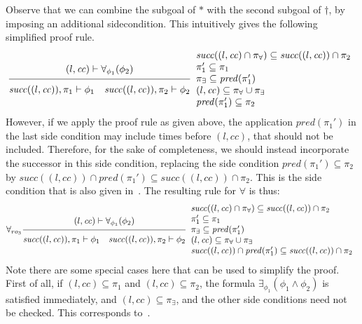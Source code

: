 \documentclass{article}
\newcommand{\proofrule}[3][]{#1 \frac{\raisebox{.7ex}{\normalsize{$#2$}}}
  {\raisebox{-1.0ex}{\normalsize{$#3$}}}}
\newcommand{\placeholder}[1][]{\pi_{#1}}
\newcommand{\loc}{l}
\newcommand{\region}{\mathit{cc}}
\newcommand{\suc}{\mathit{succ}}
\newcommand{\pre}{\mathit{pred}}
\begin{document}
Observe that we can combine the subgoal of $*$ with the second subgoal of $\dagger$, by imposing an additional sidecondition. This intuitively gives the following simplified proof rule.
\[
\proofrule
{(\loc, \region) \vdash \forall_{\phi_1}(\phi_2)}
{\suc((\loc, \region)), \placeholder[1] \vdash \phi_1
  \quad \suc((\loc, \region)), \placeholder[2] \vdash \phi_2
}
\begin{array}{l}
\suc((\loc, \region) \cap \placeholder[\forall]) \subseteq \suc((\loc, \region)) \cap \placeholder[2]\\
\placeholder[1]' \subseteq \placeholder[1]\\
\placeholder[\exists] \subseteq \pre(\placeholder[1]')\\
(\loc, \region) \subseteq \placeholder[\forall] \cup \placeholder[\exists]\\
\pre(\placeholder[1]') \subseteq \placeholder[2]
\end{array}
\]
However, if we apply the proof rule as given above, the application $\pre(\placeholder[1]')$ in 
the last side condition may include times before $(\loc, \region)$, that should not be included.
Therefore, for the sake of completeness, we should instead incorporate the successor in this
side condition, replacing the side condition $\pre(\placeholder[1]') \subseteq \placeholder[2]$ 
by $\suc((\loc, \region)) \cap \pre(\placeholder[1]') \subseteq \suc((\loc, \region)) \cap \placeholder[2]$.
This is the side condition that is also given in~\cite[Appendix C.1]{FC:14report}.
The resulting rule for $\forall$ is thus:
\[
\proofrule[\forall_{ro_3}]
{(\loc, \region) \vdash \forall_{\phi_1}(\phi_2)}
{\suc((\loc, \region)), \placeholder[1] \vdash \phi_1
  \quad \suc((\loc, \region)), \placeholder[2] \vdash \phi_2
}
\begin{array}{l}
\suc((\loc, \region) \cap \placeholder[\forall]) \subseteq \suc((\loc, \region)) \cap \placeholder[2]\\
\placeholder[1]' \subseteq \placeholder[1]\\
\placeholder[\exists] \subseteq \pre(\placeholder[1]')\\
(\loc, \region) \subseteq \placeholder[\forall] \cup \placeholder[\exists]\\
\suc((\loc, \region)) \cap \pre(\placeholder[1]') \subseteq \suc((\loc, \region)) \cap \placeholder[2]
\end{array}
\]
Note there are some special cases here that can be used to simplify the proof. First of all,
if $(\loc, \region) \subseteq \placeholder[1]$ and $(\loc, \region) \subseteq \placeholder[2]$, the formula $\exists_{\phi_1}(\phi_1 \land \phi_2)$ is satisfied immediately, and $(\loc, \region) \subseteq \placeholder[\exists]$, and the other side conditions need not be checked. This corresponds to~\cite[proof rule $\forall_{ro_2}$]{FC:14}.
\end{document}
